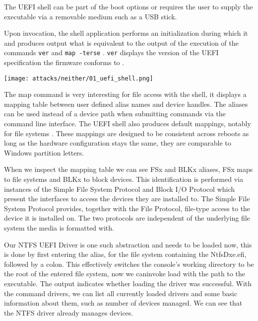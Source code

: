 The UEFI shell can be part of the boot options or requires the user to supply the executable via a removable medium such as a USB stick.

Upon invocation, the shell application performs an initialization during which it  and produces output what is equivalent to the output of the execution of the commands \lstinline{ver} and \lstinline{map -terse} \cite[3.3 Initialization]{uefi-shell}. \lstinline{ver} displays the version of the UEFI specification the firmware conforms to \cite[5.3 Shell Commands]{uefi-shell}.

\texttt{[image: attacks/neither/01\_uefi\_shell.png]}


The map command is very interesting for file access with the shell, it displays a mapping table between user defined alias names and device handles. The aliases can be used instead of a device path when submitting commands via the command line interface. The UEFI shell also produces default mappings, notably for file systems \cite[3.7.2. Mappings]{uefi-shell}. These mappings are designed to be consistent across reboots as long as the hardware configuration stays the same, they are comparable to Windows partition letters. \cite[Appendix A]{uefi-shell}

When we inspect the mapping table we can see FSx and BLKx aliases, FSx maps to file systems and BLKx to block devices. This identification is performed via instances of the Simple File System Protocol and  Block I/O Protocol which present the interfaces to access the devices they are installed to.
The Simple File System Protocol \cite[13.4 Simple File System Protocol]{uefi-spec} provides, together with the File Protocol, file-type access to the device it is installed on. The two protocols are independent of the underlying file system the media is formatted with.


Our NTFS UEFI Driver is one such abstraction and needs to be loaded now, this is done by first entering the alias, for the file system containing the NtfsDxe.efi, followed by a colon.
This effectively switches the console's working directory to be the root of the entered file system, now we caninvoke load with the path to the executable. The output indicates whether loading the driver was successful.
With the command drivers, we can list all currently loaded drivers and some basic information about them, such as number of devices managed. We can see that the NTFS driver already manages devices.

